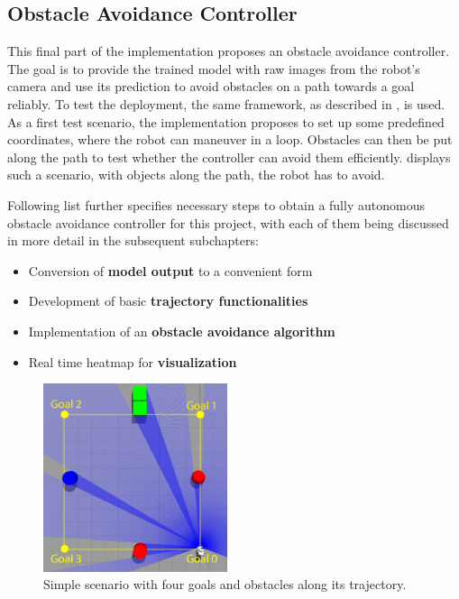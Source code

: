 \subsection{Obstacle Avoidance Controller \label{o_a_controller} }
This final part of the implementation proposes an obstacle avoidance controller. The goal is to provide the trained model with raw images from the robot's camera and use its prediction to avoid obstacles on a path towards a goal reliably. To test the deployment, the same framework, as described in , is used. As a first test scenario, the implementation proposes to set up some predefined coordinates, where the robot can maneuver in a loop. Obstacles can then be put along the path to test whether the controller can avoid them efficiently.  displays such a scenario, with objects along the path, the robot has to avoid.

Following list further specifies necessary steps to obtain a fully autonomous obstacle avoidance controller for this project, with each of them being discussed in more detail in the subsequent subchapters:

\begin{itemize}
\item Conversion of \textbf{model output} to a convenient form
\item Development of basic \textbf{trajectory functionalities}
\item Implementation of an \textbf{obstacle avoidance algorithm}
\item Real time heatmap for \textbf{visualization}
\end{itemize}

\begin{figure}[h]%
\centering
\includegraphics[width=0.48\textwidth]{Bilder/deployment_scenario.png} 
\caption[]{Simple scenario with four goals and obstacles along its trajectory.}
\label{deployment_scenario}
\end{figure}

